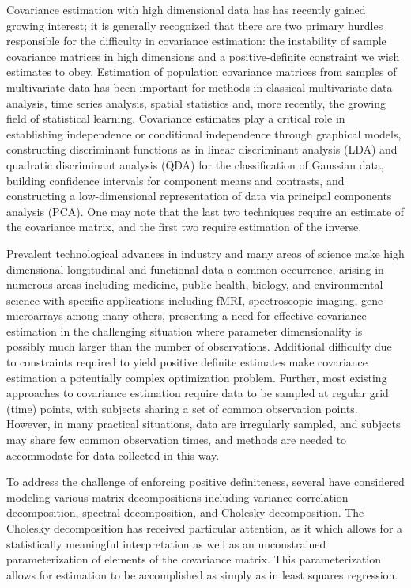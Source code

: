\documentclass[12pt]{article}
\theoremstyle{definition}
\begin{document}
Covariance estimation with high dimensional data has has recently gained growing interest; it is generally recognized that there are two primary hurdles responsible for the difficulty in covariance estimation: the instability of sample covariance matrices in high dimensions and a positive-definite constraint we wish estimates to obey. Estimation of population covariance matrices from samples of multivariate data has been important for methods in classical multivariate data analysis, time series analysis, spatial statistics and, more recently, the growing field of statistical learning. Covariance estimates play a critical role in establishing independence or conditional independence through graphical models, constructing discriminant functions as in linear discriminant analysis (LDA) and quadratic discriminant analysis (QDA) for the classification of Gaussian data, building confidence intervals for component means and contrasts, and constructing a low-dimensional representation of data via principal components analysis (PCA). One may note that the last two techniques require an estimate of the covariance matrix, and the first two require estimation of the inverse.

Prevalent technological advances in industry and many areas of science make high dimensional longitudinal and functional data a common occurrence, arising in numerous areas including medicine, public health, biology, and environmental science with specific applications including fMRI, spectroscopic imaging, gene microarrays among many others, presenting a need for effective covariance estimation in the challenging situation where parameter dimensionality is possibly much larger than the number of observations. Additional difficulty due to constraints required to yield positive definite estimates make covariance estimation a potentially complex optimization problem. Further, most existing approaches to covariance estimation require data to be sampled at regular grid (time) points, with subjects sharing a set of common observation points. However, in many practical situations, data are irregularly sampled, and subjects may share few common observation times, and methods are needed to accommodate for data collected in this way.  

To address the challenge of enforcing positive definiteness, several have considered modeling various matrix decompositions including variance-correlation decomposition, spectral decomposition, and Cholesky decomposition. The Cholesky decomposition has received particular attention, as it which allows for a statistically meaningful interpretation as well as an unconstrained parameterization of elements of the covariance matrix. This parameterization allows for estimation to be accomplished as simply as in least squares regression. 
\end{document}
